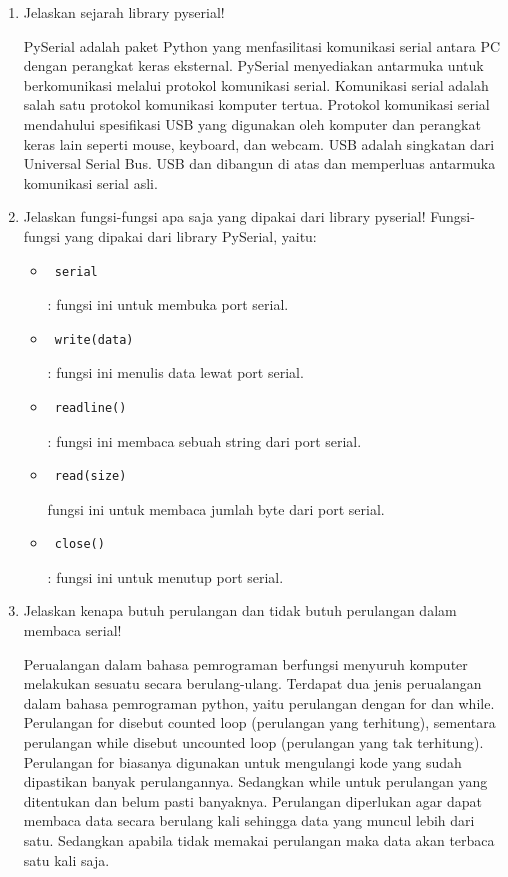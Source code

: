 \begin{enumerate}
			\item Jelaskan sejarah library pyserial!
			\par 
			PySerial adalah paket Python yang menfasilitasi komunikasi serial antara PC dengan perangkat keras eksternal. PySerial menyediakan antarmuka untuk berkomunikasi melalui protokol komunikasi serial. Komunikasi serial adalah salah satu protokol komunikasi komputer tertua. Protokol komunikasi serial mendahului spesifikasi USB yang digunakan oleh komputer dan perangkat keras lain seperti mouse, keyboard, dan webcam. USB adalah singkatan dari Universal Serial Bus. USB dan dibangun di atas dan memperluas antarmuka komunikasi serial asli.
			
			\item Jelaskan fungsi-fungsi apa saja yang dipakai dari library pyserial!
			Fungsi-fungsi yang dipakai dari library PySerial, yaitu:
				\begin{itemize}
					\item \begin{verbatim} serial \end{verbatim} : fungsi ini untuk membuka port serial.
					\item \begin{verbatim} write(data) \end{verbatim} : fungsi ini menulis data lewat port serial.
					\item \begin{verbatim} readline() \end{verbatim} : fungsi ini membaca sebuah string dari port serial.
					\item \begin{verbatim} read(size) \end{verbatim} fungsi ini untuk membaca jumlah byte dari port serial.
					\item \begin{verbatim} close() \end{verbatim} : fungsi ini untuk menutup port serial.
				\end{itemize}
			
			\item Jelaskan kenapa butuh perulangan dan tidak butuh perulangan dalam membaca serial!
			\par
			Perualangan dalam bahasa pemrograman berfungsi menyuruh komputer melakukan sesuatu secara berulang-ulang. Terdapat dua jenis perualangan dalam bahasa pemrograman python, yaitu perulangan dengan for dan while. Perulangan for disebut counted loop (perulangan yang terhitung), sementara perulangan while disebut uncounted loop (perulangan yang tak terhitung). Perulangan for biasanya digunakan untuk mengulangi kode yang sudah dipastikan banyak perulangannya. Sedangkan while untuk perulangan yang ditentukan dan belum pasti banyaknya. Perulangan diperlukan agar dapat membaca data secara berulang kali sehingga data yang muncul lebih dari satu.  Sedangkan apabila tidak memakai perulangan maka data akan terbaca satu kali saja.
			

\end{enumerate}
